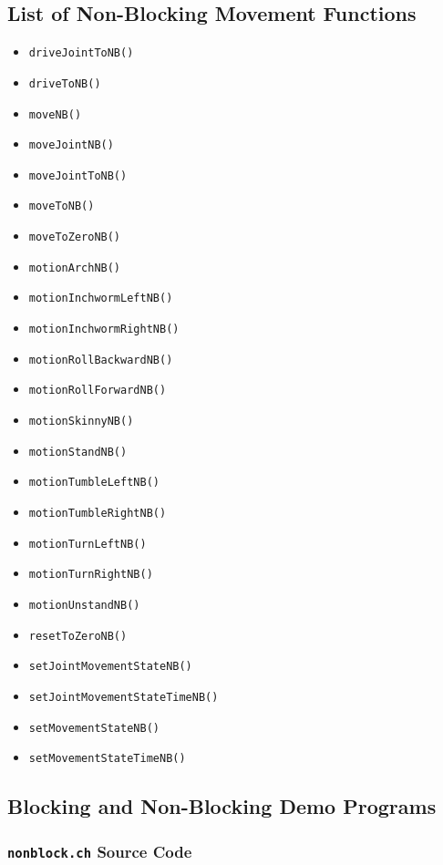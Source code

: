 \documentclass{article}
\begin{document}
\subsection{List of Non-Blocking Movement Functions}
\begin{itemize}
\item \texttt{driveJointToNB()}
\item \texttt{driveToNB()}
\item \texttt{moveNB()}
\item \texttt{moveJointNB()}
\item \texttt{moveJointToNB()}
\item \texttt{moveToNB()}
\item \texttt{moveToZeroNB()}
\item \texttt{motionArchNB()}
\item \texttt{motionInchwormLeftNB()}
\item \texttt{motionInchwormRightNB()}
\item \texttt{motionRollBackwardNB()}
\item \texttt{motionRollForwardNB()}
\item \texttt{motionSkinnyNB()}
\item \texttt{motionStandNB()}
\item \texttt{motionTumbleLeftNB()}
\item \texttt{motionTumbleRightNB()}
\item \texttt{motionTurnLeftNB()}
\item \texttt{motionTurnRightNB()}
\item \texttt{motionUnstandNB()}
\item \texttt{resetToZeroNB()}
\item \texttt{setJointMovementStateNB()}
\item \texttt{setJointMovementStateTimeNB()}
\item \texttt{setMovementStateNB()}
\item \texttt{setMovementStateTimeNB()}
\end{itemize}

\subsection{Blocking and Non-Blocking Demo Programs}
\subsubsection{\texttt{nonblock.ch} Source Code}

\end{document}

